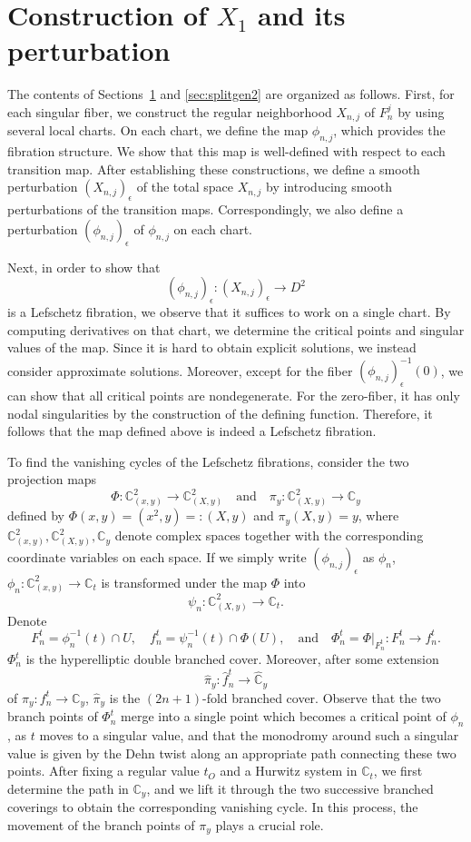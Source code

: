 \documentclass[10pt,a4paper,reqno]{amsart}
\theoremstyle{definition}
\numberwithin{equation}{section}
\numberwithin{figure}{section}
\newcommand{\C}{\mathbb{C}}
\newcommand{\arrowr}{\rightarrow}
\begin{document}
\section{Construction of $X_1$ and its perturbation}\label{sec:splitgen1}
The contents of Sections~\ref{sec:splitgen1} and \ref{sec:splitgen2} are organized as follows.
First, for each singular fiber, we construct the regular neighborhood $X_{n,j}$ of $F^j_n$ by using several local charts. 
On each chart, we define the map $\phi_{n,j}$, which provides the fibration structure.
We show that this map is well-defined with respect to each transition map.
After establishing these constructions, we define a smooth perturbation $(X_{n,j})_\epsilon$ of the total space $X_{n,j}$ 
by introducing smooth perturbations of the transition maps. 
Correspondingly, we also define a perturbation $(\phi_{n,j})_\epsilon$ of $\phi_{n,j}$ on each chart.

Next, in order to show that
\[(\phi_{n,j})_\epsilon : (X_{n,j})_\epsilon \to D^2\]
is a Lefschetz fibration, we observe that it suffices to work on a single chart. By computing derivatives on that chart, we determine the critical points and singular values of the map. Since it is hard to obtain explicit solutions, we instead consider approximate solutions.
Moreover, except for the fiber $(\phi_{n,j})_\epsilon^{-1}(0)$, we can show that all critical points are nondegenerate. 
For the zero-fiber, it has only nodal singularities by the construction of the defining function. 
Therefore, it follows that the map defined above is indeed a Lefschetz fibration.

To find the vanishing cycles of the Lefschetz fibrations,
consider the two projection maps
\[ \Phi : \C_{(x,y)}^2 \to \C_{(X,y)}^2 \quad\text{and}\quad \pi_y : \mathbb{C}_{(X,y)}^2 \to \mathbb{C}_y\]
defined by $\Phi(x,y)=(x^2,y)=:(X,y)$ and $\pi_y(X,y)=y$,
where $\C_{(x,y)}^2, \C_{(X,y)}^2, \C_y$ denote complex spaces together with the corresponding coordinate variables on each space. 
If we simply write $(\phi_{n,j})_\epsilon$ as $\phi_n$,
$\phi_n:\C_{(x,y)}^2 \arrowr \C_t$ is transformed under the map $\Phi$ into 
\[\psi_n: \C_{(X,y)}^2 \arrowr \C_t.\]
Denote \[F_n^t=\phi_n^{-1}(t)\cap U, \quad f_n^t=\psi_n^{-1}(t)\cap \Phi(U), \quad\text{and}\quad \Phi_n^t=\Phi|_{F_n^t}: F_n^t \arrowr f_n^t.\]
$\Phi_n^t$ is the hyperelliptic double branched cover.
Moreover, after some extension \[\hat{\pi}_y: \hat{f}_n^t \arrowr \hat{\C}_y\] of $\pi_y: f_n^t \arrowr \C_y$, 
$\hat{\pi}_y$ is the $(2n+1)$-fold branched cover.
Observe that the two branch points of $\Phi_n^t$ merge into a single point which becomes a critical point of $\phi_n$, 
as $t$ moves to a singular value,
and that the monodromy around such a singular value is given by the Dehn twist along an appropriate path connecting these two points.
After fixing a regular value ${t_O}$ and a Hurwitz system in $\C_t$,
we first determine the path in $\C_y$, 
and we lift it through the two successive branched coverings to obtain the corresponding vanishing cycle.
In this process, the movement of the branch points of $\pi_y$ plays a crucial role.
\end{document}
